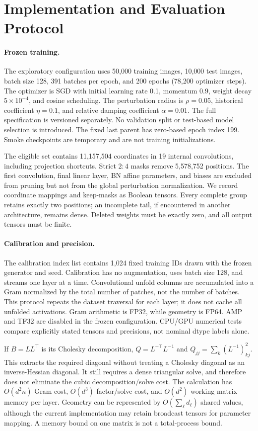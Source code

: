 \section{Implementation and Evaluation Protocol}
\label{app:protocol}
\paragraph{Frozen training.}
The exploratory configuration uses 50,000 training images, 10,000 test images, batch size 128, 391 batches per epoch, and 200 epochs (78,200 optimizer steps). The optimizer is SGD with initial learning rate 0.1, momentum 0.9, weight decay $5\times10^{-4}$, and cosine scheduling. The perturbation radius is $\rho=0.05$, historical coefficient $\eta=0.1$, and relative damping coefficient $\alpha=0.01$. The full specification is versioned separately. No validation split or test-based model selection is introduced. The fixed last parent has zero-based epoch index 199. Smoke checkpoints are temporary and are not training initializations.

The eligible set contains 11,157,504 coordinates in 19 internal convolutions, including projection shortcuts. Strict $2{:}4$ masks remove 5,578,752 positions. The first convolution, final linear layer, BN affine parameters, and biases are excluded from pruning but not from the global perturbation normalization. We record coordinate mappings and keep-masks as Boolean tensors. Every complete group retains exactly two positions; an incomplete tail, if encountered in another architecture, remains dense. Deleted weights must be exactly zero, and all output tensors must be finite.

\paragraph{Calibration and precision.}
The calibration index list contains 1,024 fixed training IDs drawn with the frozen generator and seed. Calibration has no augmentation, uses batch size 128, and streams one layer at a time. Convolutional unfold columns are accumulated into a Gram normalized by the total number of patches, not the number of batches. This protocol repeats the dataset traversal for each layer; it does not cache all unfolded activations. Gram arithmetic is FP32, while geometry is FP64. AMP and TF32 are disabled in the frozen configuration. CPU/GPU numerical tests compare explicitly stated tensors and precisions, not nominal dtype labels alone.

If $B=LL^\top$ is its Cholesky decomposition, $Q=L^{-\top}L^{-1}$ and $Q_{jj}=\sum_k(L^{-1})_{kj}^2$. This extracts the required diagonal without treating a Cholesky diagonal as an inverse-Hessian diagonal. It still requires a dense triangular solve, and therefore does not eliminate the cubic decomposition/solve cost. The calculation has $O(d^2n)$ Gram cost, $O(d^3)$ factor/solve cost, and $O(d^2)$ working matrix memory per layer. Geometry can be represented by $O(\sum_\ell d_\ell)$ shared values, although the current implementation may retain broadcast tensors for parameter mapping. A memory bound on one matrix is not a total-process bound.

